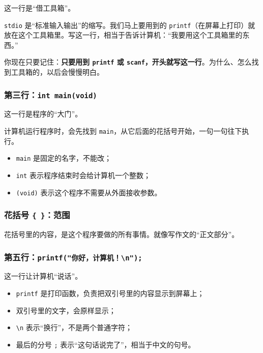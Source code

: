 这一行是“借工具箱”。

\texttt{stdio} 是“标准输入输出”的缩写。我们马上要用到的 \texttt{printf}（在屏幕上打印）就放在这个工具箱里。写这一行，相当于告诉计算机：“我要用这个工具箱里的东西。”

\begin{tipbox}[暂时不用深究]
你现在只要记住：\textbf{只要用到 \texttt{printf} 或 \texttt{scanf}，开头就写这一行}。为什么、怎么找到工具箱的，以后会慢慢明白。
\end{tipbox}

\subsubsection*{第三行：\texttt{int main(void)}}

这一行是程序的“大门”。

计算机运行程序时，会先找到 \texttt{main}，从它后面的花括号开始，一句一句往下执行。

\begin{itemize}
  \item \texttt{main} 是固定的名字，不能改；
  \item \texttt{int} 表示程序结束时会给计算机一个整数；
  \item \texttt{(void)} 表示这个程序不需要从外面接收参数。
\end{itemize}

\subsubsection*{花括号 \texttt{\{ \}}：范围}

花括号里的内容，是这个程序要做的所有事情。就像写作文的“正文部分”。

\subsubsection*{第五行：\texttt{printf("你好，计算机！\textbackslash n");}}

这一行让计算机“说话”。

\begin{itemize}
  \item \texttt{printf} 是打印函数，负责把双引号里的内容显示到屏幕上；
  \item 双引号里的文字，会原样显示；
  \item \texttt{\textbackslash n} 表示“换行”，不是两个普通字符；
  \item 最后的分号 \texttt{;} 表示“这句话说完了”，相当于中文的句号。
\end{itemize}

